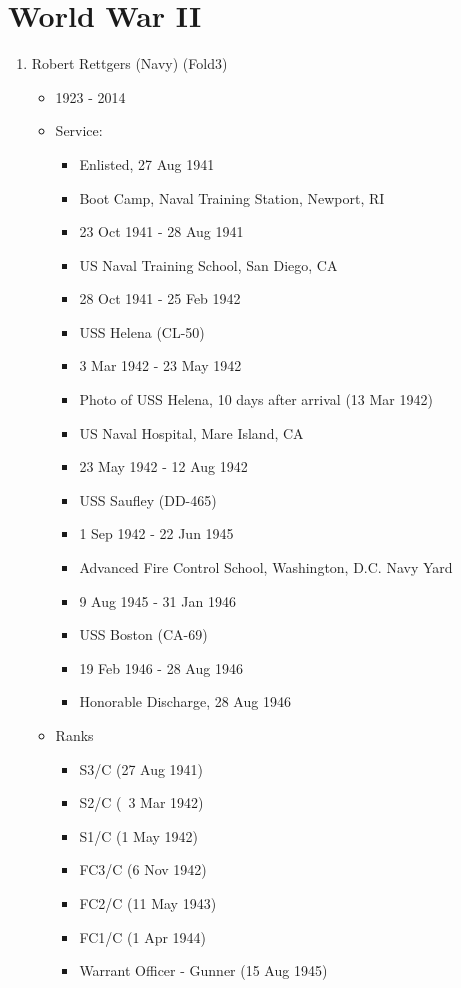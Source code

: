 \documentclass[11pt,letter]{book}
\begin{document}
\chapter{World War II}

\begin{enumerate}

\item Robert Rettgers (Navy) (Fold3)
\begin{itemize}
\item 1923 - 2014
\item Service:
\begin{itemize}
\item Enlisted, 27 Aug 1941
\item Boot Camp, Naval Training Station, Newport, RI
\item 23 Oct 1941 - 28 Aug 1941
\item US Naval Training School, San Diego, CA
\item 28 Oct 1941 - 25 Feb 1942
\item USS Helena (CL-50)
\item 3 Mar 1942 - 23 May 1942
\item Photo of USS Helena, 10 days after arrival (13 Mar 1942)
\item US Naval Hospital, Mare Island, CA
\item 23 May 1942 - 12 Aug 1942
\item USS Saufley (DD-465)
\item 1 Sep 1942 - 22 Jun 1945
\item Advanced Fire Control School, Washington, D.C. Navy Yard
\item 9 Aug 1945 - 31 Jan 1946
\item USS Boston (CA-69)
\item 19 Feb 1946 - 28 Aug 1946
\item Honorable Discharge, 28 Aug 1946
\end{itemize}
\item Ranks
\begin{itemize}
\item S3/C (27 Aug 1941)
\item S2/C (~3 Mar 1942)
\item S1/C (1 May 1942)
\item FC3/C (6 Nov 1942)
\item FC2/C (11 May 1943)
\item FC1/C (1 Apr 1944)
\item Warrant Officer - Gunner (15 Aug 1945)
\end{itemize}
\end{itemize}


\end{enumerate}
\end{document}
